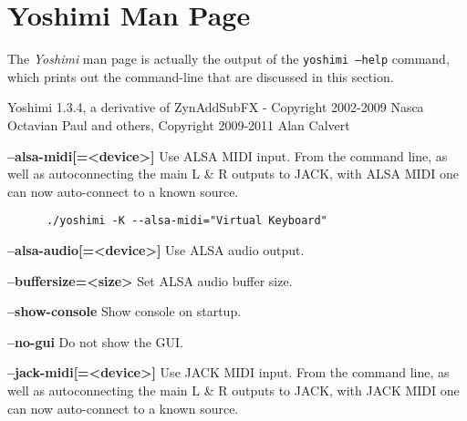 %
%
%

\section{Yoshimi Man Page}
\label{sec:yoshimi_man_page}

   The \textsl{Yoshimi} man page is actually the output of the
   \texttt{yoshimi --help} command, which prints out the command-line that
   are discussed in this section.

Yoshimi 1.3.4, a derivative of ZynAddSubFX - Copyright 2002-2009
Nasca Octavian Paul and others, Copyright 2009-2011 Alan Calvert

   \setcounter{ItemCounter}{0}      %

      \textbf{--alsa-midi[=<device>]}
      Use ALSA MIDI input.
      From the command line, as well as autoconnecting the main L \& R
      outputs to JACK, with ALSA MIDI one can now auto-connect to a known source.

   \begin{verbatim}
      ./yoshimi -K --alsa-midi="Virtual Keyboard"
   \end{verbatim}

      \textbf{--alsa-audio[=<device>]}
      Use ALSA audio output.

      \textbf{--buffersize=<size>}
      Set ALSA audio buffer size.

      \textbf{--show-console}
      Show console on startup.

      \textbf{--no-gui}
      Do not show the GUI.

      \textbf{--jack-midi[=<device>]} 
      Use JACK MIDI input.
      From the command line, as well as autoconnecting the main L \& R
      outputs to JACK, with JACK MIDI one can now auto-connect to a known source.

